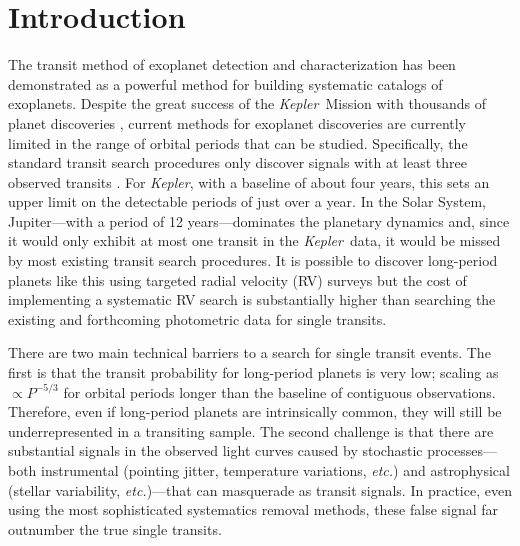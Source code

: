 \documentclass[12pt,preprint]{aastex}
\newcommand{\project}[1]{\textsl{#1}}
\newcommand{\kepler}{\project{Kepler}}
\newcommand{\foreign}[1]{\emph{#1}}
\newcommand{\etc}{\foreign{etc.}}
\newcommand{\period}{{\ensuremath{P}}}
\begin{document}

\section{Introduction}

The transit method of exoplanet detection and characterization has been
demonstrated as a powerful method for building systematic catalogs of
exoplanets.
Despite the great success of the \kepler\ Mission with thousands of planet
discoveries \citep{Burke:2014, Rowe:2015}, current methods for exoplanet
discoveries are currently limited in the range of orbital periods that can be
studied.
Specifically, the standard transit search procedures only discover signals
with at least three observed transits \citep[for example][]{Petigura:2013,
Burke:2014, Rowe:2015}.
For \kepler, with a baseline of about four years, this sets an upper limit on
the detectable periods of just over a year.
In the Solar System, Jupiter---with a period of 12 years---dominates the
planetary dynamics and, since it would only exhibit at most one transit in the
\kepler\ data, it would be missed by most existing transit search procedures.
It is possible to discover long-period planets like this using targeted radial
velocity (RV) surveys \citep[for example][]{Butler:2006, Knutson:2014} but the
cost of implementing a systematic RV search is substantially higher than
searching the existing and forthcoming photometric data for single transits.

There are two main technical barriers to a search for single transit events.
The first is that the transit probability for long-period planets is very low;
scaling as $\propto\period^{-5/3}$ for orbital periods longer than the
baseline of contiguous observations.
Therefore, even if long-period planets are intrinsically common, they will
still be underrepresented in a transiting sample.
The second challenge is that there are substantial signals in the observed
light curves caused by stochastic processes---both instrumental
(pointing jitter, temperature variations, \etc) and astrophysical (stellar
variability, \etc)---that can masquerade as transit signals.
In practice, even using the most sophisticated systematics removal methods,
these false signal far outnumber the true single transits.
\end{document}
